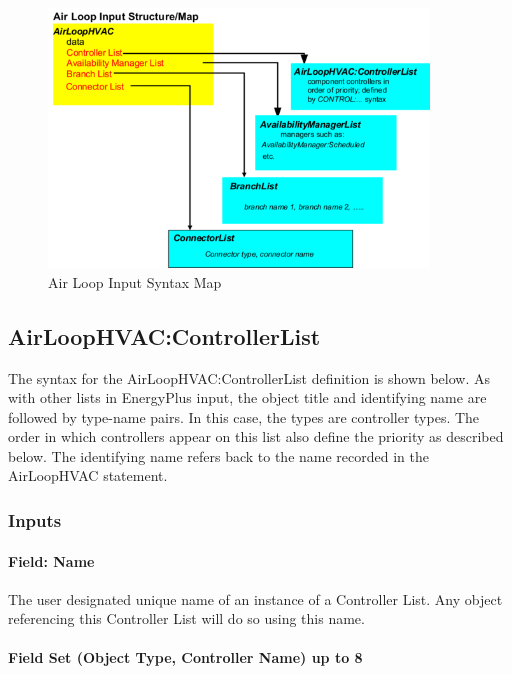\begin{figure}[hbtp] %
\centering
\includegraphics[width=0.9\textwidth, height=0.9\textheight, keepaspectratio=true]{media/image214.png}
\caption{Air Loop Input Syntax Map \protect \label{fig:air-loop-input-syntax-map}}
\end{figure}

\subsection{AirLoopHVAC:ControllerList}\label{airloophvaccontrollerlist}

The syntax for the AirLoopHVAC:ControllerList definition is shown below. As with other lists in EnergyPlus input, the object title and identifying name are followed by type-name pairs. In this case, the types are controller types. The order in which controllers appear on this list also define the priority as described below. The identifying name refers back to the name recorded in the AirLoopHVAC statement.

\subsubsection{Inputs}\label{inputs-1-002}

\paragraph{Field: Name}\label{field-name-1-001}

The user designated unique name of an instance of a Controller List. Any object referencing this Controller List will do so using this name.

\paragraph{Field Set (Object Type, Controller Name) up to 8}\label{field-set-object-type-controller-name-up-to-8}

